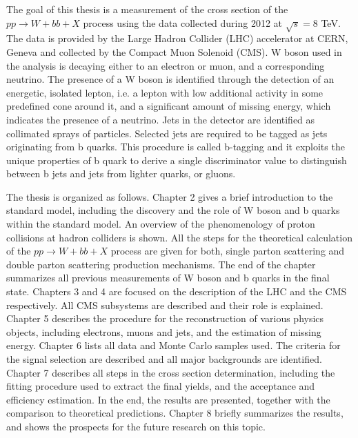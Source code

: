 \par The goal of this thesis is a measurement of the cross section of the $pp\rightarrow W+bb+X$ process using the data collected during 2012 at $\sqrt{s} = 8$ TeV. The data is provided by the Large Hadron Collider (LHC) accelerator at CERN, Geneva and collected by the Compact Muon Solenoid (CMS). W boson used in the analysis is decaying either to an electron or muon, and a corresponding neutrino. The presence of a W boson is identified through the detection of an energetic, isolated lepton, i.e. a lepton with low additional activity in some predefined cone around it, and a significant amount of missing energy, which indicates the presence of a neutrino. Jets in the detector are identified as collimated sprays of particles. Selected jets are required to be tagged as jets originating from b quarks. This procedure is called b-tagging and it exploits the unique properties of b quark to derive a single discriminator value to distinguish between b jets and jets from lighter quarks, or gluons. 

The thesis is organized as follows. Chapter 2 gives a brief introduction to the standard model, including the discovery and the role of W boson and b quarks within the standard model. An overview of the phenomenology of proton collisions at hadron colliders is shown. All the steps for the theoretical calculation of the $pp\rightarrow W+bb+X$ process are given for both, single parton scattering and double parton scattering production mechanisms. The end of the chapter summarizes all previous measurements of W boson and b quarks in the final state. Chapters 3 and 4 are focused on the description of the LHC and the CMS respectively. All CMS subsystems are described and their role is explained. Chapter 5 describes the procedure for the reconstruction of various physics objects, including electrons, muons and jets, and the estimation of missing energy. Chapter 6 lists all data and Monte Carlo samples used. The criteria for the signal selection are described and all major backgrounds are identified. Chapter 7 describes all steps in the cross section determination, including the fitting procedure used to extract the final yields, and the acceptance and efficiency estimation. In the end, the results are presented, together with the comparison to theoretical predictions. Chapter 8 briefly summarizes the results, and shows the prospects for the future research on this topic.
